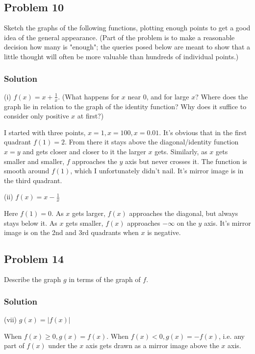 \subsection*{Problem 10}
Sketch the graphs of the following functions, plotting enough points to get a good idea of the general appearance. (Part of the problem is to make a reasonable decision how many is "enough"; the queries posed below are meant to show that a little thought will often be more valuable than hundreds of individual points.)

\subsubsection*{Solution}
(i) $f(x)=x+\frac{1}{x}$. (What happens for $x$ near 0, and for large $x$? Where does the graph lie in relation to the graph of the identity function? Why does it suffice to consider only positive $x$ at first?)

\vs

I started with three points, $x=1, x=100, x=0.01$. It's obvious that in the first quadrant $f(1)=2$. From there it stays above the diagonal/identity function $x=y$ and gets closer and closer to it the larger $x$ gets. Similarly, as $x$ gets smaller and smaller, $f$ approaches the $y$ axis but never crosses it. The function is smooth around $f(1)$, which I unfortunately didn't nail. It's mirror image is in the third quadrant.

\vs

(ii) $f(x)=x-\frac{1}{x}$

\vs

Here $f(1)=0$. As $x$ gets larger, $f(x)$ approaches the diagonal, but always stays below it. As $x$ gets smaller, $f(x)$ approaches $-\infty$ on the $y$ axis. It's mirror image is on the 2nd and 3rd quadrants when $x$ is negative.

\subsection*{Problem 14}
Describe the graph $g$ in terms of the graph of $f$.

\subsubsection*{Solution}
(vii) $g(x)=|f(x)|$

When $f(x)\geq 0, g(x)=f(x)$. When $f(x)<0, g(x)=-f(x)$, i.e. any part of $f(x)$ under the $x$ axis gets drawn as a mirror image above the $x$ axis.

